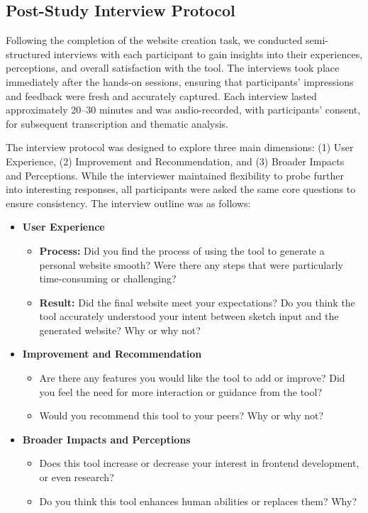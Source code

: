 \subsection{Post-Study Interview Protocol}
\label{sec:post-study}

Following the completion of the website creation task, we conducted semi-structured interviews with each participant to gain insights into their experiences, perceptions, and overall satisfaction with the tool. The interviews took place immediately after the hands-on sessions, ensuring that participants' impressions and feedback were fresh and accurately captured. Each interview lasted approximately 20--30 minutes and was audio-recorded, with participants' consent, for subsequent transcription and thematic analysis.

The interview protocol was designed to explore three main dimensions: (1) User Experience, (2) Improvement and Recommendation, and (3) Broader Impacts and Perceptions. While the interviewer maintained flexibility to probe further into interesting responses, all participants were asked the same core questions to ensure consistency. The interview outline was as follows:

\begin{itemize}
    \item \textbf{User Experience}
    \begin{itemize}
        \item \textbf{Process:} Did you find the process of using the tool to generate a personal website smooth? Were there any steps that were particularly time-consuming or challenging?
        \item \textbf{Result:} Did the final website meet your expectations? Do you think the tool accurately understood your intent between sketch input and the generated website? Why or why not?
    \end{itemize}

    \item \textbf{Improvement and Recommendation}
    \begin{itemize}
        \item Are there any features you would like the tool to add or improve? Did you feel the need for more interaction or guidance from the tool?
        \item Would you recommend this tool to your peers? Why or why not?
    \end{itemize}

    \item \textbf{Broader Impacts and Perceptions}
    \begin{itemize}
        \item Does this tool increase or decrease your interest in frontend development, or even research?
        \item Do you think this tool enhances human abilities or replaces them? Why?
    \end{itemize}
\end{itemize}